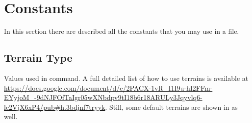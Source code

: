     \section{Constants}

    In this section there are described all the constants that you may use in a  file.

    \subsection{Terrain Type}
    \label{subsection:terraintype}

    Values used in  command. A full detailed list of how to use terrains is available at \url{https://docs.google.com/document/d/e/2PACX-1vR_I1I9u-hI2FFm-EYyjoM_-9dNJFOfTaIgr05wXNbdpv9tI18b6r18ARULy3Jqyvlq6-lc2VjX6xP4/pub#h.3bdjnf7tryyk}. Still, some default terrains are shown in  as well.

